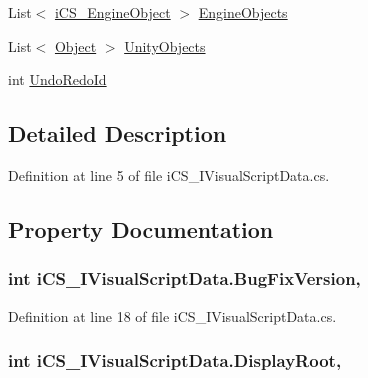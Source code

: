 \begin{DoxyCompactItemize}
\item 
List$<$ \hyperlink{classi_c_s___engine_object}{i\+C\+S\+\_\+\+Engine\+Object} $>$ \hyperlink{interfacei_c_s___i_visual_script_data_aa904329924cda1f4a3b775a047bd8851}{Engine\+Objects}
\item 
List$<$ \hyperlink{i_c_s___logic_8cs_a5b2c8b05b9a357906d7f9e5b2c1e154d}{Object} $>$ \hyperlink{interfacei_c_s___i_visual_script_data_a5eb5bf075c6fb73444afbc77b78ab6cd}{Unity\+Objects}
\item 
int \hyperlink{interfacei_c_s___i_visual_script_data_ae02959ac798ff21e2fa42cba487274ec}{Undo\+Redo\+Id}
\end{DoxyCompactItemize}


\subsection{Detailed Description}


Definition at line 5 of file i\+C\+S\+\_\+\+I\+Visual\+Script\+Data.\+cs.



\subsection{Property Documentation}
\hypertarget{interfacei_c_s___i_visual_script_data_a9c7450656ec18fc630a4958740ea4d4f}{
\subsubsection[{Bug\+Fix\+Version}]{\setlength{\rightskip}{0pt plus 5cm}int i\+C\+S\+\_\+\+I\+Visual\+Script\+Data.\+Bug\+Fix\+Version\hspace{0.3cm}{\ttfamily [get]}, {\ttfamily [set]}}}\label{interfacei_c_s___i_visual_script_data_a9c7450656ec18fc630a4958740ea4d4f}


Definition at line 18 of file i\+C\+S\+\_\+\+I\+Visual\+Script\+Data.\+cs.

\hypertarget{interfacei_c_s___i_visual_script_data_adf7a14db20d51d85ab9b9b8a295d9e15}{
\subsubsection[{Display\+Root}]{\setlength{\rightskip}{0pt plus 5cm}int i\+C\+S\+\_\+\+I\+Visual\+Script\+Data.\+Display\+Root\hspace{0.3cm}{\ttfamily [get]}, {\ttfamily [set]}}}\label{interfacei_c_s___i_visual_script_data_adf7a14db20d51d85ab9b9b8a295d9e15}


